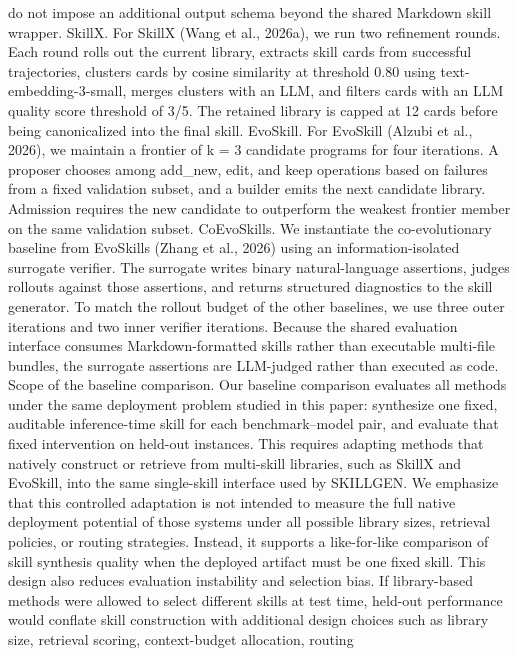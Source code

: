 do not impose an additional output schema beyond the shared Markdown skill wrapper.
SkillX.
For SkillX (Wang et al., 2026a), we run two refinement rounds. Each round rolls out the
current library, extracts skill cards from successful trajectories, clusters cards by cosine similarity at
threshold 0.80 using text-embedding-3-small, merges clusters with an LLM, and filters cards
with an LLM quality score threshold of 3/5. The retained library is capped at 12 cards before being
canonicalized into the final skill.
EvoSkill.
For EvoSkill (Alzubi et al., 2026), we maintain a frontier of k = 3 candidate programs
for four iterations. A proposer chooses among add\_new, edit, and keep operations based on failures
from a fixed validation subset, and a builder emits the next candidate library. Admission requires the
new candidate to outperform the weakest frontier member on the same validation subset.
CoEvoSkills.
We instantiate the co-evolutionary baseline from EvoSkills (Zhang et al., 2026) using
an information-isolated surrogate verifier. The surrogate writes binary natural-language assertions,
judges rollouts against those assertions, and returns structured diagnostics to the skill generator. To
match the rollout budget of the other baselines, we use three outer iterations and two inner verifier
iterations. Because the shared evaluation interface consumes Markdown-formatted skills rather than
executable multi-file bundles, the surrogate assertions are LLM-judged rather than executed as code.
Scope of the baseline comparison.
Our baseline comparison evaluates all methods under the same
deployment problem studied in this paper: synthesize one fixed, auditable inference-time skill for
each benchmark–model pair, and evaluate that fixed intervention on held-out instances. This requires
adapting methods that natively construct or retrieve from multi-skill libraries, such as SkillX and
EvoSkill, into the same single-skill interface used by SKILLGEN. We emphasize that this controlled
adaptation is not intended to measure the full native deployment potential of those systems under
all possible library sizes, retrieval policies, or routing strategies. Instead, it supports a like-for-like
comparison of skill synthesis quality when the deployed artifact must be one fixed skill.
This design also reduces evaluation instability and selection bias. If library-based methods were
allowed to select different skills at test time, held-out performance would conflate skill construction
with additional design choices such as library size, retrieval scoring, context-budget allocation, routing
